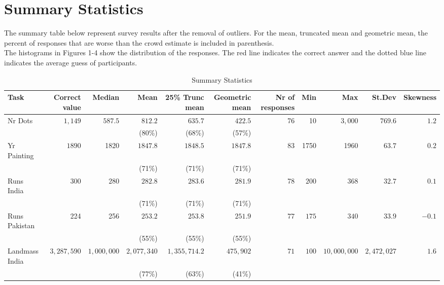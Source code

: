 \documentclass{article}
\begin{document}
\section*{Summary Statistics}

The summary table below represent survey results after the removal of outliers. For the mean, truncated mean and geometric mean, the percent of responses that are worse than the crowd estimate is included in parenthesis. \\

The histograms in Figures 1-4 show the distribution of the responses. The red line indicates the correct answer and the dotted blue line indicates the average guess of participants.


\begin{table}[h]
\begin{adjustbox}{max width=\textwidth}
\begin{tabular}{|l||r|r|r|r|r||r|r|r|r|r|}
\hline
Task & Correct value & Median & Mean & 25\% Trunc mean & Geometric mean & Nr of responses	& Min & Max & 	St.Dev & Skewness \\
\hline
Nr Dots & $1,149$ & $587.5$ & $812.2$ & $ 635.7 $ & $422.5$ & 76 & 10 & $3,000$ & $769.6$ & $1.2$ \\
& & & (80\%) & (68\%) & (57\%) & & & & &  \\
Yr Painting & $1890$ & 1820 & $1847.8$ & $1848.5$ & $1847.8$ & 83 & 1750 & 1960 & $63.7$ & $0.2$ \\
& & & (71\%) & (71\%) & (71\%) & & & & &  \\        
Runs India & $300$ & $280$ & $282.8$ & $ 283.6$ & $281.9$ & 78 & $200$ &	$368$	& $32.7$ & $0.1$ \\
& & & (71\%) & (71\%) & (71\%) & & & & &  \\   
Runs Pakistan & 224	& 256 & $253.2$ & $253.8$ & $251.9$ & $77$ & $175$ & $340$ & $33.9$ & $-0.1$ \\
& & & (55\%) & (55\%) & (55\%) & & & & &  \\   
Landmass India & $3,287,590$ & $1,000,000$ & $2,077,340$ &	 $1,355,714.2$ & $475,902$	& $71$ & $100$ &	 $10,000,000$ & $2,472,027$ & $1.6$ \\
& & & (77\%) & (63\%) & (41\%) & & & & &  \\
\hline
\end{tabular}
\end{adjustbox}
\caption{Summary Statistics}
\label{stats}
\end{table} 
\end{document}
